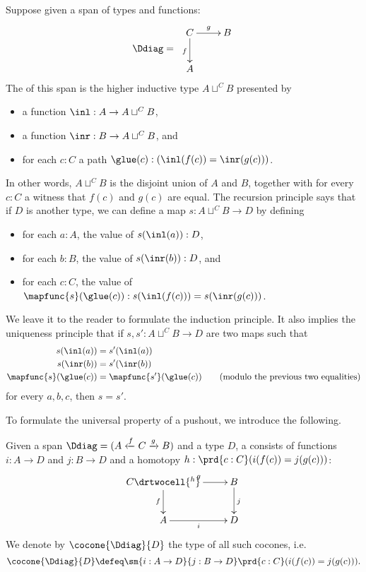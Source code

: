 %
%
%
Suppose given a span of types and functions:
\[\Ddiag=\;\vcenter{\xymatrix{C \ar^g[r] \ar_f[d] & B \\ A & }}\]
The  of this span is the higher inductive type $A\sqcup^CB$ presented by
\begin{itemize}
\item a function $\inl:A\to A\sqcup^CB$,
\item a function $\inr:B \to A\sqcup^CB$, and
\item for each $c:C$ a path $\glue(c):(\inl(f(c))=\inr(g(c)))$.
\end{itemize}
In other words, $A\sqcup^CB$ is the disjoint union of $A$ and $B$, together with for every $c:C$ a witness that $f(c)$ and $g(c)$ are equal.
The recursion principle says that if $D$ is another type, we can define a map $s:A\sqcup^CB\to{}D$ by defining
\begin{itemize}
\item for each $a:A$, the value of $s(\inl(a)):D$,
\item for each $b:B$, the value of $s(\inr(b)):D$, and
\item for each $c:C$, the value of $\mapfunc{s}(\glue(c)):s(\inl(f(c)))=s(\inr(g(c)))$.
\end{itemize}
We leave it to the reader to formulate the induction principle.
It also implies the uniqueness principle that if $s,s':A\sqcup^CB\to{}D$ are two maps such that
%
\begin{align*}
  s(\inl(a))&=s'(\inl(a))\\
  s(\inr(b))&=s'(\inr(b))\\
  \mapfunc{s}(\glue(c))&=\mapfunc{s'}(\glue(c))
  \qquad\text{(modulo the previous two equalities)}
\end{align*}
for every $a,b,c$, then $s=s'$.

To formulate the universal property of a pushout, we introduce the following.

\begin{defn}\label{defn:cocone}
  Given a span $\Ddiag= (A \xleftarrow{f} C \xrightarrow{g} B)$ and a type $D$, a 
  consists of functions $i:A\to{}D$ and $j:B\to{}D$ and a homotopy $h : \prd{c:C} (i(f(c))=j(g(c)))$:
  \[\uppercurveobject{{ }}\lowercurveobject{{ }}\twocellhead{{ }}
  \xymatrix{C \ar^g[r] \ar_f[d] \drtwocell{^h} & B \ar^j[d] \\ A \ar_i[r] & D
  }\]
  We denote by $\cocone{\Ddiag}{D}$ the type of all such cocones, i.e.
  \[ \cocone{\Ddiag}{D} \defeq
  \sm{i:A\to D}{j:B\to D} \prd{c:C} (i(f(c))=j(g(c))).
  \]
\end{defn}

